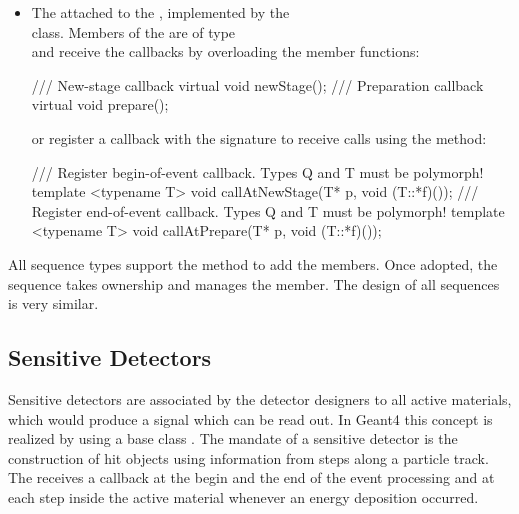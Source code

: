 \documentclass[10pt,a4paper]{article}
\begin{document}
\begin{itemize}
\item The  attached to the 
    {}, implemented by the \\
     class.
    Members of the  are of type\\
    {} and receive the callbacks by overloading the member functions:
\begin{unnumberedcode}
/// New-stage callback
virtual void newStage();
/// Preparation callback
virtual void prepare();
\end{unnumberedcode}
    or register a callback with the signature {}
    to receive calls using the method:
\begin{unnumberedcode}
/// Register begin-of-event callback. Types Q and T must be polymorph!
template <typename T> void callAtNewStage(T* p, void (T::*f)());
/// Register end-of-event callback. Types Q and T must be polymorph!
template <typename T> void callAtPrepare(T* p, void (T::*f)());
\end{unnumberedcode}
\end{itemize}

\noindent
All sequence types support the method 
to add the members. Once adopted, the sequence takes ownership and manages
the member. The design of all sequences is very similar. 

\subsection{Sensitive Detectors}
\label{sec:ddg4-user-manual-geant4sensitivedetectors}

\noindent
Sensitive detectors are associated by the detector designers to all active 
materials, which would produce a signal which can be read out. In Geant4 this concept
is realized by using a base class .
The mandate of a sensitive detector is the construction of hit objects 
using information from steps along a particle track. 
The  receives 
a callback at the begin and the end of the event processing and at each step
inside the active material whenever an energy deposition occurred.
\end{document}
